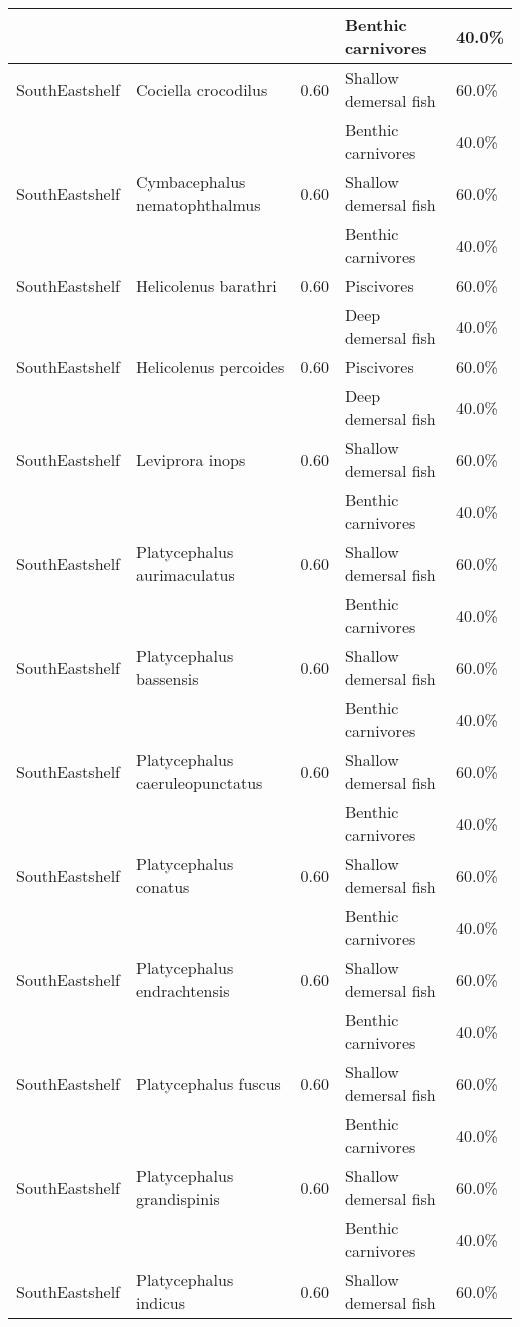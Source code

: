 \begin{longtable}{llcll}
& & & Benthic carnivores & 40.0\% \\
\hline
SouthEastshelf & Cociella crocodilus & 0.60 & Shallow demersal fish & 60.0\% \\
& & & Benthic carnivores & 40.0\% \\
\hline
SouthEastshelf & Cymbacephalus nematophthalmus & 0.60 & Shallow demersal fish & 60.0\% \\
& & & Benthic carnivores & 40.0\% \\
\hline
SouthEastshelf & Helicolenus barathri & 0.60 & Piscivores & 60.0\% \\
& & & Deep demersal fish & 40.0\% \\
\hline
SouthEastshelf & Helicolenus percoides & 0.60 & Piscivores & 60.0\% \\
& & & Deep demersal fish & 40.0\% \\
\hline
SouthEastshelf & Leviprora inops & 0.60 & Shallow demersal fish & 60.0\% \\
& & & Benthic carnivores & 40.0\% \\
\hline
SouthEastshelf & Platycephalus aurimaculatus & 0.60 & Shallow demersal fish & 60.0\% \\
& & & Benthic carnivores & 40.0\% \\
\hline
SouthEastshelf & Platycephalus bassensis & 0.60 & Shallow demersal fish & 60.0\% \\
& & & Benthic carnivores & 40.0\% \\
\hline
SouthEastshelf & Platycephalus caeruleopunctatus & 0.60 & Shallow demersal fish & 60.0\% \\
& & & Benthic carnivores & 40.0\% \\
\hline
SouthEastshelf & Platycephalus conatus & 0.60 & Shallow demersal fish & 60.0\% \\
& & & Benthic carnivores & 40.0\% \\
\hline
SouthEastshelf & Platycephalus endrachtensis & 0.60 & Shallow demersal fish & 60.0\% \\
& & & Benthic carnivores & 40.0\% \\
\hline
SouthEastshelf & Platycephalus fuscus & 0.60 & Shallow demersal fish & 60.0\% \\
& & & Benthic carnivores & 40.0\% \\
\hline
SouthEastshelf & Platycephalus grandispinis & 0.60 & Shallow demersal fish & 60.0\% \\
& & & Benthic carnivores & 40.0\% \\
\hline
SouthEastshelf & Platycephalus indicus & 0.60 & Shallow demersal fish & 60.0\% \\

\end{longtable}
